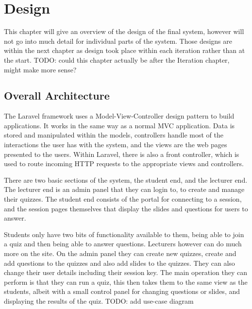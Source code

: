 \chapter{Design}
This chapter will give an overview of the design of the final system, however will not go into much detail for individual parts of the system. Those designs are within the next chapter as design took place within each iteration rather than at the start.
TODO: could this chapter actually be after the Iteration chapter, might make more sense?

\section{Overall Architecture}
The Laravel framework uses a Model-View-Controller design pattern to build applications. It works in the same way as a normal MVC application. Data is stored and manipulated within the models, controllers handle most of the interactions the user has with the system, and the views are the web pages presented to the users. Within Laravel, there is also a front controller, which is used to route incoming HTTP requests to the appropriate views and controllers\cite{Laravel-architechture}.

There are two basic sections of the system, the student end, and the lecturer end. The lecturer end is an admin panel that they can login to, to create and manage their quizzes. The student end consists of the portal for connecting to a session, and the session pages themselves that display the slides and questions for users to answer.

Students only have two bits of functionality available to  them, being able to join a quiz and then being able to answer questions. Lecturers however can do much more on the site. On the admin panel they can create new quizzes, create and add questions to the quizzes and also add slides to the quizzes. They can also change their user details including their session key. The main operation they can perform is that they can run a quiz, this then takes them to the same view as the students, albeit with a small control panel for changing questions or slides, and displaying the results of the quiz. TODO: add use-case diagram

